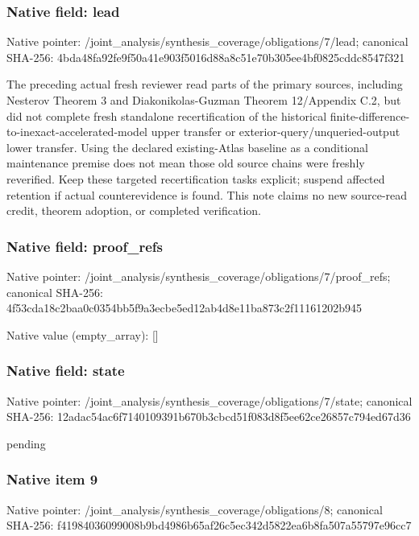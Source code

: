 \documentclass[10pt,a4paper]{article}
\begin{document}
\subsubsection{Native field: lead}
Native pointer: /joint\_\allowbreak{}analysis/synthesis\_\allowbreak{}coverage/obligations/7/lead; canonical SHA-256: 4bda48fa92fe9f50a41e903f5016d88a8c51e70b305ee4bf0825cddc8547f321

\begingroup\raggedright\sloppy The preceding actual fresh reviewer read parts of the primary sources,\allowbreak{} including Nesterov Theorem 3 and Diakonikolas-Guzman Theorem 12/\allowbreak{}Appendix C.2,\allowbreak{} but did not complete fresh standalone recertification of the historical finite-difference-to-inexact-accelerated-model upper transfer or exterior-query/\allowbreak{}unqueried-output lower transfer. Using the declared existing-Atlas baseline as a conditional maintenance premise does not mean those old source chains were freshly reverified. Keep these targeted recertification tasks explicit;\allowbreak{} suspend affected retention if actual counterevidence is found. This note claims no new source-read credit,\allowbreak{} theorem adoption,\allowbreak{} or completed verification.\par\endgroup

\subsubsection{Native field: proof\_\allowbreak{}refs}
Native pointer: /joint\_\allowbreak{}analysis/synthesis\_\allowbreak{}coverage/obligations/7/proof\_\allowbreak{}refs; canonical SHA-256: 4f53cda18c2baa0c0354bb5f9a3ecbe5ed12ab4d8e11ba873c2f11161202b945

Native value (empty\_\allowbreak{}array): []

\subsubsection{Native field: state}
Native pointer: /joint\_\allowbreak{}analysis/synthesis\_\allowbreak{}coverage/obligations/7/state; canonical SHA-256: 12adac54ac6f7140109391b670b3cbcd51f083d8f5ee62ce26857c794ed67d36

\begingroup\raggedright\sloppy pending\par\endgroup

\subsubsection{Native item 9}
Native pointer: /joint\_\allowbreak{}analysis/synthesis\_\allowbreak{}coverage/obligations/8; canonical SHA-256: f41984036099008b9bd4986b65af26c5ec342d5822ea6b8fa507a55797e96cc7
\end{document}
